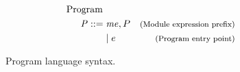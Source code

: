 \begin{figure}[!htb]
\captionsetup{skip=0pt}
\begin{align*}
\begin{aligned}
\text{Program } \\
\mathit{P} ::= \; & \mathit{me}, P & \footnotesize\text{(Module expression prefix)}\\
&|\; e & \footnotesize\text{(Program entry point)}\\
\end{aligned}
\end{align*}
\caption[Syntax: Program Language]{Program language syntax. \label{fig:ProgramSyntax}}
\label{fig:Syntax}
\end{figure}
